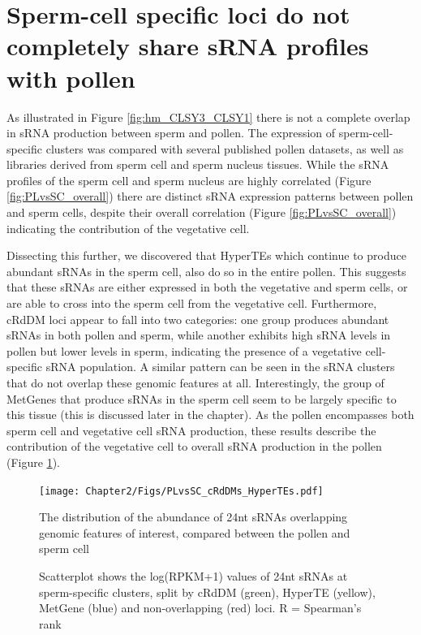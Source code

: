 \section{Sperm-cell specific loci do not completely share sRNA profiles with pollen}

As illustrated in Figure \ref{fig:hm_CLSY3_CLSY1} there is not a complete overlap in sRNA production between sperm and pollen. The expression of sperm-cell-specific clusters was compared with several published pollen datasets, as well as libraries derived from sperm cell and sperm nucleus tissues. While the sRNA profiles of the sperm cell and sperm nucleus are highly correlated (Figure \ref{fig:PLvsSC_overall}) there are distinct sRNA expression patterns between pollen and sperm cells, despite their overall correlation (Figure \ref{fig:PLvsSC_overall}) indicating the contribution of the vegetative cell. 

Dissecting this further, we discovered that HyperTEs which continue to produce abundant sRNAs in the sperm cell, also do so in the entire pollen.  This suggests that these sRNAs are either expressed in both the vegetative and sperm cells, or are able to cross into the sperm cell from the vegetative cell. Furthermore, cRdDM loci appear to fall into two categories: one group produces abundant sRNAs in both pollen and sperm, while another exhibits high sRNA levels in pollen but lower levels in sperm, indicating the presence of a vegetative cell-specific sRNA population. A similar pattern can be seen in the sRNA clusters that do not overlap these genomic features at all. Interestingly, the group of MetGenes that produce sRNAs in the sperm cell seem to be  largely specific to this tissue (this is discussed later in the chapter). As the pollen encompasses both sperm cell and vegetative cell sRNA production, these results describe the contribution of the vegetative cell to overall sRNA production in the pollen (Figure \ref{fig:PLvSC_cRdDMs}).

\begin{figure}[htbp!] 
\centering    
    \texttt{[image: Chapter2/Figs/PLvsSC\_cRdDMs\_HyperTEs.pdf]}
\caption{The distribution of the abundance of 24nt sRNAs overlapping genomic features of interest, compared between the pollen and sperm cell}
\label{fig:PLvSC_cRdDMs}
\captionsetup{font=small}
    \caption*{Scatterplot shows the log(RPKM+1) values of 24nt sRNAs at sperm-specific clusters, split by cRdDM (green), HyperTE (yellow), MetGene (blue) and non-overlapping (red) loci. R = Spearman's rank}
\end{figure}


